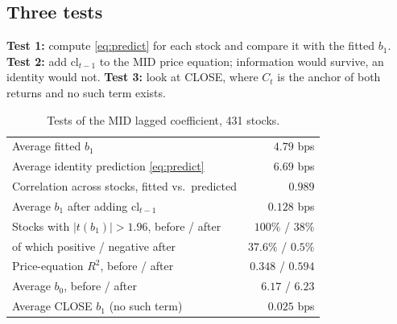 \documentclass[11pt,a4paper]{article}
\begin{document}
\subsection{Three tests}

\textbf{Test 1:} compute \eqref{eq:predict} for each stock and compare it with the fitted $b_1$.
\textbf{Test 2:} add $\mathrm{cl}_{t-1}$ to the MID price equation; information would survive, an
identity would not. \textbf{Test 3:} look at CLOSE, where $C_t$ is the anchor of both returns and no
such term exists.

\begin{table}[htbp]
\centering
\caption{Tests of the MID lagged coefficient, 431 stocks.}
\label{tab:tests}
\small
\begin{tabular}{@{}lr@{}}
\toprule
Average fitted $b_1$ & $4.79$ bps \\
Average identity prediction \eqref{eq:predict} & $6.69$ bps \\
Correlation across stocks, fitted vs.\ predicted & $0.989$ \\
\midrule
Average $b_1$ after adding $\mathrm{cl}_{t-1}$ & $0.128$ bps \\
Stocks with $|t(b_1)|>1.96$, before / after & $100\%$ / $38\%$ \\
\quad of which positive / negative after & $37.6\%$ / $0.5\%$ \\
Price-equation $R^2$, before / after & $0.348$ / $0.594$ \\
Average $b_0$, before / after & $6.17$ / $6.23$ \\
\midrule
Average CLOSE $b_1$ (no such term) & $0.025$ bps \\
\bottomrule
\end{tabular}
\end{table}
\end{document}

